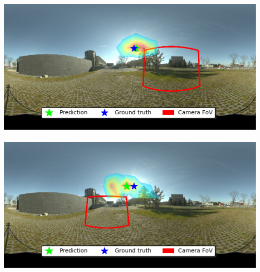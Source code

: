 \begin{minipage}{\linewidth}
\begin{multicols}{4}
\vspace{\panoheight}\\
\includegraphics[width=\mywidth]{AG8A2917_Panorama_hdr-corrected.jpg}\\
\vspace{\panoheight}\\
\includegraphics[width=\mywidth]{AG8A2917_Panorama_hdr-corrected_003.jpg}\\


\end{multicols}
\end{minipage}








